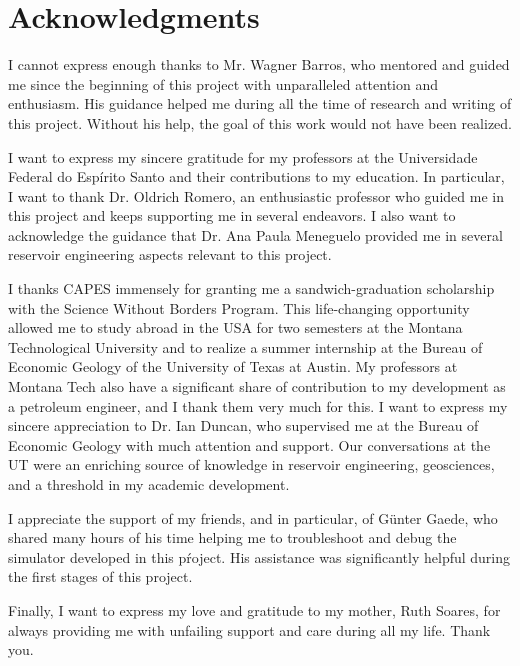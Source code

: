 \newpage
{} %
\thispagestyle{empty}

\chapter*{Acknowledgments}
\thispagestyle{empty}


I cannot express enough thanks to Mr. Wagner Barros, who mentored and guided me since the beginning of this project with unparalleled attention and enthusiasm.
%
His guidance helped me during all the time of research and writing of this project.
%
Without his help, the goal of this work would not have been realized.

I want to express my sincere gratitude for my professors at the Universidade Federal do Esp\'irito Santo and their contributions to my education.
%
In particular, I want to thank Dr. Oldrich Romero, an enthusiastic professor who guided me in this project and keeps supporting me in several endeavors.
%
I also want to acknowledge the guidance that Dr. Ana Paula Meneguelo provided me in several reservoir engineering aspects relevant to this project.

I thanks CAPES immensely for granting me a sandwich-graduation scholarship with the Science Without Borders Program.
%
This life-changing opportunity allowed me to study abroad in the USA for two semesters at the Montana Technological University and to realize a summer internship at the Bureau of Economic Geology of the University of Texas at Austin.
%
My professors at Montana Tech also have a significant share of contribution to my development as a petroleum engineer, and I thank them very much for this.
%
I want to express my sincere appreciation to Dr. Ian Duncan, who supervised me at the Bureau of Economic Geology with much attention and support. Our conversations at the UT were an enriching source of knowledge in reservoir engineering, geosciences, and a threshold in my academic development.


I appreciate the support of my friends, and in particular, of G\"unter Gaede, who shared many hours of his time helping me to troubleshoot and debug the simulator developed in this pŕoject.
%
His assistance was significantly helpful during the first stages of this project.


Finally, I want to express my love and gratitude to my mother, Ruth Soares, for always providing me with unfailing support and care during all my life. Thank you.